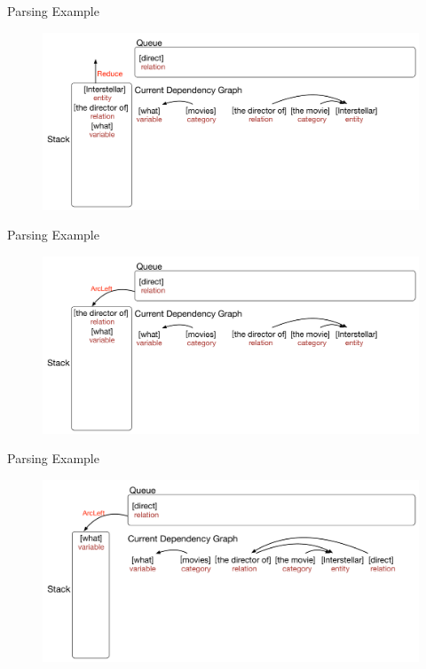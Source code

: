 \documentclass{beamer}
\begin{document}
\begin{frame}{Parsing Example}
	\begin{figure}
		\centering\includegraphics[width=1.0\textwidth]{introduction/parsing_examples/23.pdf}
	\end{figure}	
\end{frame}

\begin{frame}{Parsing Example}
	\begin{figure}
		\centering\includegraphics[width=1.0\textwidth]{introduction/parsing_examples/24.pdf}
	\end{figure}	
\end{frame}

\begin{frame}{Parsing Example}
	\begin{figure}
		\centering\includegraphics[width=1.0\textwidth]{introduction/parsing_examples/25.pdf}
	\end{figure}	
\end{frame}
\end{document}
